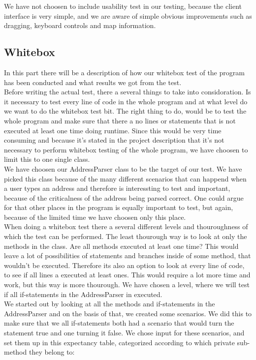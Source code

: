 \documentclass[a4paper,10pt,titlepage]{article}
\begin{document}
We have not choosen to include usability test in our testing, because the client interface is very simple, and we are aware of simple obvious improvements such as dragging, keyboard controls and map information.

	
		
		\subsection{Whitebox}		
			In this part there will be a description of how our whitebox test of the program has been conducted and what results we got from the test. \\
Before writing the actual test, there a several things to take into considoration. Is it necessary to test every line of code in the whole program and at what level do we want to do the whitebox test bit. The right thing to do, would be to test the whole program and make sure that there a no lines or statements that is not executed at least one time doing runtime. Since this would be very time consuming and because it's stated in the project description that it's not necessary to perform whitebox testing of the whole program, we have choosen to limit this to one single class.  \\
We have choosen our AddressParser class to be the target of our test. We have picked this class because of the many different scenarios that can happend when a user types an address and therefore is interessting to test and important, because of the criticalness of the address being parsed correct. One could argue for that other places in the program is equally important to test, but again, because of the limited time we have choosen only this place. \\
When doing a whitebox test there a several different levels and thouroughness of which the test can be performed. The least thourough way is to look at only the methods in the class. Are all methods executed at least one time? This would leave a lot of possibilities of statements and branches inside of some method, that wouldn't be executed. Therefore its also an option to look at every line of code, to see if all lines a executed at least ones. This would require a lot more time and work, but this way is more thourough. We have chosen a level, where we will test if all if-statements in the AddressParser in executed. \\

We started out by looking at all the methods and if-statements in the AddressParser and on the basis of that, we created some scenarios. We did this to make sure that we all if-statements both had a scenario that would turn the statement true and one turning it false. We chose input for these scenarios, and set them up in this expectancy table, categorized according to which private sub-method they belong to:
\end{document}
